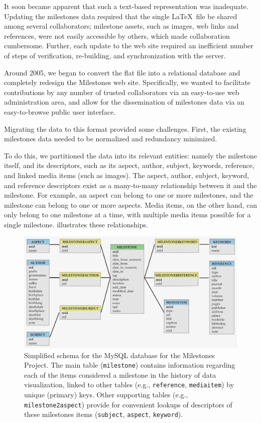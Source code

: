 It soon became apparent that such a text-based representation was inadequate. Updating the milestones data required that the single \LaTeX\ file be shared among several collaborators; milestone assets, such as images, web links and references, were not easily accessible by others, which made collaboration cumbersome. Further, each update to the web site required an inefficient number of steps of verification, re-building, and synchronization with the server.

Around 2005, we began to convert the flat file into a relational database and completely redesign the Milestones web site. Specifically, we wanted to facilitate contributions by any number of trusted collaborators via an easy-to-use web administration area, and allow for the dissemination of milestones data via an easy-to-browse public user interface.

Migrating the data to this format provided some challenges. First, the existing milestones data needed to be normalized and redundancy minimized. 

To do this, we partitioned the data into its relevant entities: namely the milestone itself, and its descriptors, such as its aspect, author, subject, keywords, reference, and linked media items (such as images). The aspect, author, subject, keyword, and reference descriptors exist as a many-to-many relationship between it and the milestone. For example, an aspect can belong to one or more milestones, and the milestone can belong to one or more aspects. Media items, on the other hand, can only belong to one milestone at a time, with multiple media items possible for a single milestone.  illustrates these relationships.

\begin{figure}[!htb]
  \centering
  \includegraphics[width=\textwidth,clip]{fig/datavis-schema-3}
  \caption{Simplified schema for the MySQL database for the Milestones Project. The main 
  table (\texttt{milestone}) contains information regarding each of the items considered a milestone in the history of data visualization, linked to other tables (e.g., \texttt{reference}, \texttt{mediaitem}) by unique (primary) keys. Other supporting tables (e.g., \texttt{milestone2aspect}) provide for convenient lookups of descriptors of these milestones items (\texttt{subject}, \texttt{aspect}, \texttt{keyword}).
  }
  \label{fig:datavis-schema-2}
\end{figure}

